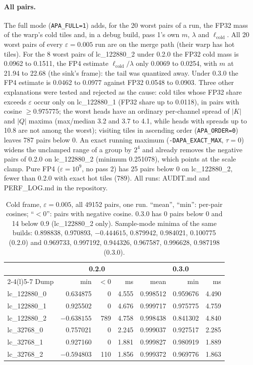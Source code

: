 \documentclass[10pt,twocolumn]{article}
\newcommand{\eps}{\varepsilon}
\newcommand{\code}[1]{\texttt{#1}}
\begin{document}
\paragraph{All pairs.} The full mode (\code{APA\_FULL=1}) adds, for the 20 worst pairs of a run, the FP32
mass of the warp's cold tiles and, in a debug build, pass 1's own $m$, $\lambda$ and $\ell_{\text{cold}}$.
All 20 worst pairs of every $\eps=0.005$ run are on the merge path (their warp has hot tiles). For the 8
worst pairs of lc\_122880\_2 under 0.2.0 the FP32 cold mass is 0.0962 to 0.1511, the FP4 estimate
$\ell_{\text{cold}}/\lambda$ only 0.0069 to 0.0254, with $m$ at 21.94 to 22.68 (the sink's frame): the
tail was quantized away. Under 0.3.0 the FP4 estimate is 0.0462 to 0.0977 against FP32 0.0548 to 0.0903.
Three other explanations were tested and rejected as the cause: cold tiles whose FP32 share exceeds $\eps$
occur only on lc\_122880\_1 (FP32 share up to 0.0118), in pairs with cosine $\ge 0.975775$; the worst heads have an ordinary per-channel
spread of $|K|$ and $|Q|$ maxima (max/median 3.2 and 3.7 to 4.1, while heads with spreads up to 10.8 are not
among the worst); visiting tiles in ascending order (\code{APA\_ORDER=0}) leaves 787 pairs below 0. An exact
running maximum (\code{-DAPA\_EXACT\_MAX}, $\tau=0$) widens the unclamped range of a group by $2^4$ and
already removes the negative pairs of 0.2.0 on lc\_122880\_2 (minimum 0.251078), which points at the scale clamp. Pure FP4
($\eps=10^9$, no pass 2) has 25 pairs below 0 on lc\_122880\_2, fewer than 0.2.0 with exact hot tiles
(789). All runs: AUDIT.md and PERF\_LOG.md in the repository.

\begin{table}[t]
\centering\small
\setlength{\tabcolsep}{2pt}
\begin{tabular}{@{}lrrrrrr@{}}
\toprule
& \multicolumn{3}{c}{0.2.0} & \multicolumn{3}{c}{0.3.0} \\
\cmidrule(lr){2-4}\cmidrule(l){5-7}
Dump & min & $<0$ & ms & mean & min & ms \\
\midrule
lc\_122880\_0 & 0.634875 & 0 & 4.555 & 0.998512 & 0.959676 & 4.490 \\
lc\_122880\_1 & 0.925502 & 0 & 4.676 & 0.999717 & 0.975775 & 4.759 \\
lc\_122880\_2 & $-0.638155$ & 789 & 4.758 & 0.998438 & 0.841302 & 4.840 \\
lc\_32768\_0 & 0.757021 & 0 & 2.245 & 0.999037 & 0.927517 & 2.285 \\
lc\_32768\_1 & 0.927160 & 0 & 1.881 & 0.999827 & 0.980919 & 1.889 \\
lc\_32768\_2 & $-0.594803$ & 110 & 1.856 & 0.999372 & 0.969776 & 1.863 \\
\bottomrule
\end{tabular}
\caption{Cold frame, $\eps=0.005$, all 49152 pairs, one run. ``mean'', ``min'': per-pair cosines; ``$<0$'':
pairs with negative cosine. 0.3.0 has 0 pairs below 0 and 14 below 0.9 (lc\_122880\_2 only). Sample-mode
minima of the same builds: 0.898838, 0.970893, $-0.444615$, 0.879942, 0.984021, 0.100775 (0.2.0) and
0.969733, 0.997192, 0.944326, 0.967587, 0.996628, 0.987198 (0.3.0).}
\label{tab:cold}
\end{table}
\end{document}
